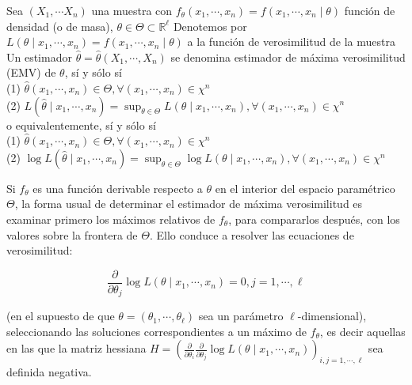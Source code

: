 Sea $\left(X_{1}, \cdots X_{n}\right)$ una muestra con $f_{\theta}\left(x_{1},
  \cdots, x_{n}\right)=f\left(x_{1}, \cdots, x_{n} \mid \theta\right)$ función de
densidad (o de masa), $\theta \in \Theta \subset \mathbb{R}^{\ell}$ Denotemos
por $L\left(\theta \mid x_{1}, \cdots, x_{n}\right)=f\left(x_{1}, \cdots, x_{n}
  \mid \theta\right)$ a la función de verosimilitud de la muestra Un estimador
$\hat{\theta}=\hat{\theta}\left(X_{1}, \cdots, X_{n}\right)$ se denomina
estimador de máxima verosimilitud (EMV) de $\theta$, sí y sólo sí\\ (1)
$\hat{\theta}\left(x_{1}, \cdots, x_{n}\right) \in \Theta, \forall\left(x_{1},
  \cdots, x_{n}\right) \in \chi^{n}$\\ (2) $L\left(\hat{\theta} \mid x_{1},
  \cdots, x_{n}\right)=\sup _{\theta \in \Theta} L\left(\theta \mid x_{1},
  \cdots, x_{n}\right), \forall\left(x_{1}, \cdots, x_{n}\right) \in \chi^{n}$\\
o equivalentemente, sí y sólo sí\\ (1) $\hat{\theta}\left(x_{1}, \cdots,
  x_{n}\right) \in \Theta, \forall\left(x_{1}, \cdots, x_{n}\right) \in
  \chi^{n}$\\ (2) $\log L\left(\hat{\theta} \mid x_{1}, \cdots, x_{n}\right)=\sup
  _{\theta \in \Theta} \log L\left(\theta \mid x_{1}, \cdots, x_{n}\right),
  \forall\left(x_{1}, \cdots, x_{n}\right) \in \chi^{n}$

Si $f_{\theta}$ es una función derivable respecto a $\theta$ en el interior del
espacio paramétrico $\Theta$, la forma usual de determinar el estimador de
máxima verosimilitud es examinar primero los máximos relativos de $f_{\theta}$,
para compararlos después, con los valores sobre la frontera de $\Theta$. Ello
conduce a resolver las ecuaciones de verosimilitud:

$$
  \frac{\partial}{\partial \theta_{j}} \log L\left(\theta \mid x_{1}, \cdots, x_{n}\right)=0, j=1, \cdots, \ell
$$

(en el supuesto de que $\theta=\left(\theta_{1}, \cdots, \theta_{\ell}\right)$ sea un parámetro $\ell$-dimensional), seleccionando las soluciones correspondientes a un máximo de $f_{\theta}$, es decir aquellas en las que la matriz hessiana $H=\left(\frac{\partial}{\partial \theta_{i}} \frac{\partial}{\partial \theta_{j}} \log L\left(\theta \mid x_{1}, \cdots, x_{n}\right)\right)_{i, j=1, \cdots, \ell}$ sea definida negativa.\\

